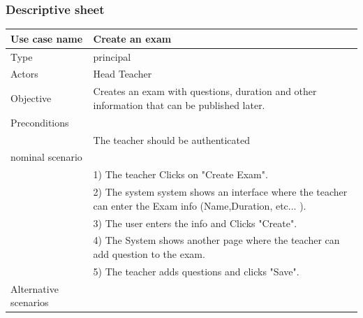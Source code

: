 \documentclass[]{uc2pfecaneva}
\begin{document}
\subsubsection{Descriptive sheet}
\begin{table}[h]
	\centering
	\begin{tabularx}{\textwidth}{|l|X|}
		\hline
		Use case name         & Create an exam                                                                                              \\ \hline
		Type                  & principal                                                                                                   \\ \hline
		Actors                & Head Teacher                                                                                                \\ \hline
		Objective             & Creates an exam with questions, duration and other information that can be published later.                 \\ \hline
		Preconditions         &                                                                                                             \\
		                      & The teacher should be authenticated                                                                         \\ \hline
		nominal scenario      &                                                                                                             \\
		                      & 1) The teacher Clicks on "Create Exam".                                                                     \\
		                      & 2) The system system shows an interface where the teacher can enter the Exam info (Name,Duration, etc... ). \\
		                      & 3) The user enters the info and Clicks "Create".                                                            \\
		                      & 4) The System shows another page where the teacher can add question to the exam.                            \\
		                      & 5) The teacher  adds questions and clicks "Save".                                                           \\ \hline
		Alternative scenarios &                                                                                                             \\

\end{tabularx}
\end{table}
\end{document}
